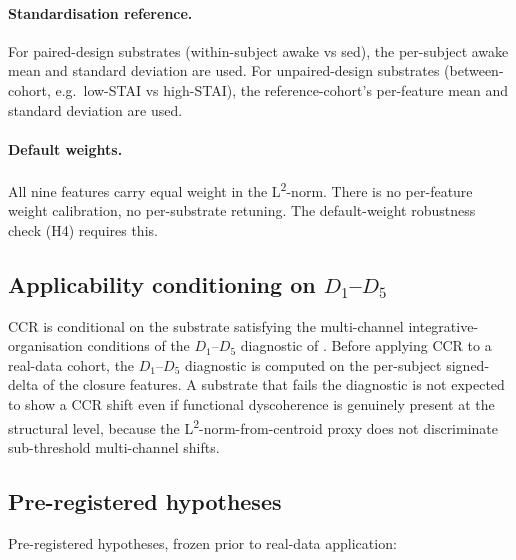 \documentclass[11pt,a4paper]{article}
\begin{document}
\paragraph{Standardisation reference.} For paired-design substrates (within-subject awake vs sed), the per-subject awake mean and standard deviation are used. For unpaired-design substrates (between-cohort, e.g.\ low-STAI vs high-STAI), the reference-cohort's per-feature mean and standard deviation are used.

\paragraph{Default weights.} All nine features carry equal weight in the L\textsuperscript{2}-norm. There is no per-feature weight calibration, no per-substrate retuning. The default-weight robustness check (H4) requires this.

\subsection{Applicability conditioning on $D_1$--$D_5$}\label{sec:methods-diagnostic}

CCR is conditional on the substrate satisfying the multi-channel integrative-organisation conditions of the $D_1$--$D_5$ diagnostic of \citep{SmartClosureDistance}. Before applying CCR to a real-data cohort, the $D_1$--$D_5$ diagnostic is computed on the per-subject signed-delta of the closure features. A substrate that fails the diagnostic is not expected to show a CCR shift even if functional dyscoherence is genuinely present at the structural level, because the L\textsuperscript{2}-norm-from-centroid proxy does not discriminate sub-threshold multi-channel shifts.

\subsection{Pre-registered hypotheses}\label{sec:methods-prereg}

Pre-registered hypotheses, frozen prior to real-data application:
\end{document}
